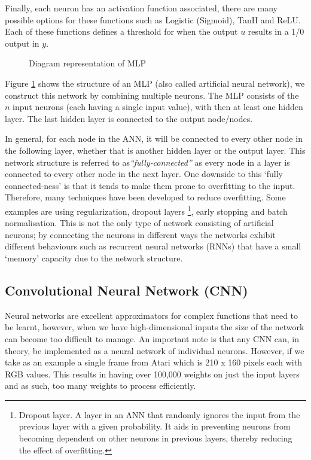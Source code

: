 Finally, each neuron has an activation function associated, there are many possible options for these functions such as Logistic (Sigmoid), TanH and ReLU. Each of these functions defines a threshold for when the output $u$ results in a 1/0 output in $y$.

\begin{figure}[ht!]
	\centering
	\caption{Diagram representation of MLP} \label{fig:mlp}
\end{figure}

Figure \ref{fig:mlp} shows the structure of an MLP (also called artificial neural network), we construct this network by combining multiple neurons. The MLP consists of the $n$ input neurons (each having a single input value), with then at least one hidden layer. The last hidden layer is connected to the output node/nodes.

In general, for each node in the ANN, it will be connected to every other node in the following layer, whether that is another hidden layer or the output layer. This network structure is referred to as\textit{``fully-connected''} as every node in a layer is connected to every other node in the next layer. One downside to this `fully connected-ness' is that it tends to make them prone to overfitting to the input. Therefore, many techniques have been developed to reduce overfitting. Some examples are using regularization, dropout layers \footnote{Dropout layer. A layer in an ANN that randomly ignores the input from the previous layer with a given probability. It aids in preventing neurons from becoming dependent on other neurons in previous layers, thereby reducing the effect of overfitting.}, early stopping and batch normalisation. This is not the only type of network consisting of artificial neurons; by connecting the neurons in different ways the networks exhibit different behaviours such as recurrent neural networks (RNNs) that have a small `memory' capacity due to the network structure.

\subsection{Convolutional Neural Network (CNN)}
\label{dsgn:sec:dl:cnn}
Neural networks are excellent approximators for complex functions that need to be learnt, however, when we have high-dimensional inputs the size of the network can become too difficult to manage. An important note is that any CNN can, in theory, be implemented as a neural network of individual neurons. However, if we take as an example a single frame from Atari which is 210 x 160 pixels each with RGB values. This results in having over 100,000 weights on just the input layers and as such, too many weights to process efficiently.

